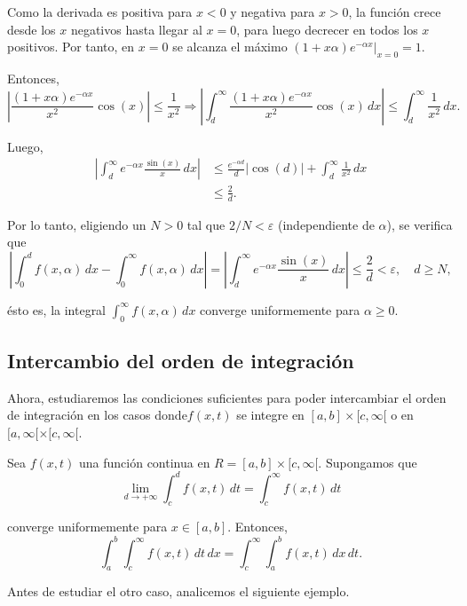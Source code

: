 \begin{ejemplo}
Como la derivada es positiva para $x < 0$ y negativa para $x > 0$, la función crece desde los $x$ negativos hasta llegar al $x = 0$, para luego decrecer en todos los $x$ positivos. Por tanto, en $x = 0$ se alcanza el máximo $(1+x\alpha) e^{-\alpha x} |_{x = 0} = 1$.

Entonces,
$$\left|\frac{(1+x\alpha) e^{-\alpha x}}{x^2} \cos(x) \right| \leq \frac{1}{x^2} \Rightarrow \left| \int_d^{\infty} \frac{(1+x\alpha) e^{-\alpha x}}{x^2} \cos(x) \,dx \right| \leq \int_d^{\infty} \frac{1}{x^2} \,dx.$$

Luego, 
\begin{align*}
 \left|  \int_{d}^{\infty} e^{-\alpha x} \frac{\sin(x)}{x} \,dx\right| &\leq \frac{e^{-\alpha d}}{d}|\cos(d)| + \int_d^{\infty} \frac{1}{x^2} \,dx \\
 &\leq \frac{2}{d}. 
\end{align*}

Por lo tanto, eligiendo un $N > 0$ tal que $2/N < \varepsilon$ (independiente de $\alpha$), se verifica que
$$\left| \int_0^d f(x,\alpha) \,dx- \int_0^{\infty} f(x,\alpha) \,dx \right| = \left|  \int_{d}^{\infty} e^{-\alpha x} \frac{\sin(x)}{x} \,dx \right| \leq \frac{2}{d} < \varepsilon, \quad d \geq N,$$

ésto es, la integral $\int_0^{\infty} f(x,\alpha) \,dx$ converge uniformemente para $\alpha \geq 0$.
\end{ejemplo}

\subsection{Intercambio del orden de integración}

Ahora, estudiaremos las condiciones suficientes para poder intercambiar el orden de integración en los casos donde$f(x,t)$ se integre en $[a,b] \times [c,\infty[$ o en $[a,\infty [\times [c, \infty[$.

\begin{teorema} \label{TeoA:OrdenIntegracion1}
    Sea $f(x,t)$ una función continua en $R = [a,b] \times [c, \infty[$. Supongamos que 
    $$\lim_{d \to + \infty} \int_c^d f(x,t) \,dt = \int_c^{\infty} f(x,t) \,dt$$

    converge uniformemente para $x \in [a,b]$. Entonces, 
    $$\int_a^b \int_c^{\infty} f(x,t) \,dt \,dx = \int_c^{\infty} \int_a^b f(x,t) \,dx \,dt.$$
\end{teorema}

Antes de estudiar el otro caso, analicemos el siguiente ejemplo.

